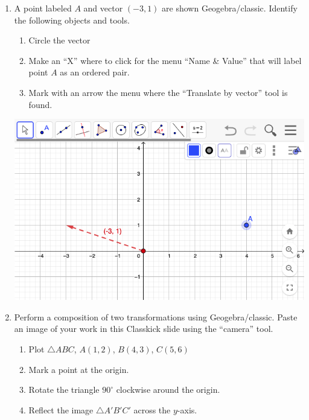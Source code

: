 \begin{enumerate}
\item A point labeled $A$ and vector $(-3,1)$ are shown Geogebra/classic. Identify the following objects and tools.
\begin{enumerate}
  \item Circle the vector
  \item Make an ``X'' where to click for the menu ``Name \& Value'' that will label point $A$ as an ordered pair.
  \item Mark with an arrow the menu where the ``Translate by vector'' tool is found.
\end{enumerate}
\begin{flushright}
  \includegraphics[width=6.25in]{../graphics/08Geogebra_toolbar.png}
\end{flushright}

\item Perform a composition of two transformations using Geogebra/classic. Paste an image of your work in this Classkick slide using the ``camera'' tool.
  \begin{enumerate}
    \item Plot $\triangle ABC$, $A(1,2)$, $B(4,3)$, $C(5,6)$
    \item Mark a point at the origin.
    \item Rotate the triangle $90^\circ$ clockwise around the origin.
    \item Reflect the image $\triangle A'B'C'$ across the $y$-axis.
  \end{enumerate}          


\end{enumerate}
